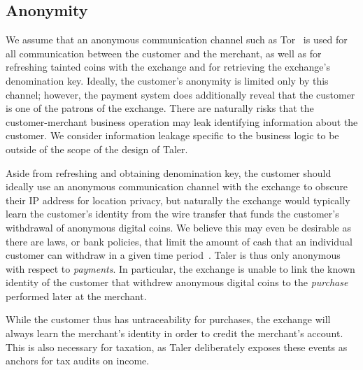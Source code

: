 \documentclass{llncs}
\begin{document}
\subsection{Anonymity}

We assume that an anonymous communication channel
such as Tor~\cite{tor-design} is
used for all communication between the customer and the merchant,
as well as for refreshing tainted coins with the exchange and for
retrieving the exchange's denomination key.
Ideally, the customer's anonymity is limited only by this channel;
however, the payment system does additionally reveal that the customer
is one of the patrons of the exchange.
There are naturally risks that the customer-merchant business operation
may leak identifying information about the customer.
We consider information leakage specific to the business logic to be
outside of the scope of the design of Taler.

Aside from refreshing and obtaining denomination key, the customer
should ideally use an anonymous communication channel with the exchange
to obscure their IP address for location privacy, but naturally
the exchange would typically learn the customer's identity from the wire
transfer that funds the customer's withdrawal of anonymous digital coins.
We believe this may even be desirable as there are laws, or bank policies,
that limit the amount of cash that an individual customer can withdraw
in a given time period~\cite{france2015cash,greece2015cash}.
Taler is thus only anonymous with respect to {\em payments}.
In particular, the exchange
is unable to link the known identity of the customer that withdrew
anonymous digital coins to the {\em purchase} performed later at the
merchant.

While the customer thus has untraceability for purchases, the exchange will
always learn the merchant's identity in order to credit the merchant's
account.  This is also necessary for taxation, as Taler deliberately
exposes these events as anchors for tax audits on income.


\end{document}
